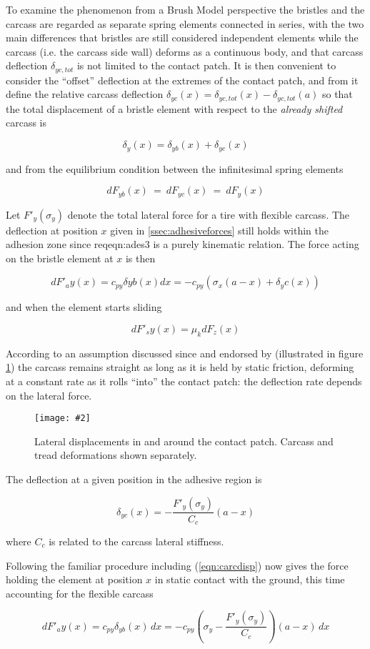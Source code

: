 \documentclass[12pt,a4paper]{report}
\newcommand{\virgolette}[1]{
\textquotedblleft #1\textquotedblright
}
\newcommand{\figura}[5][htbp]{
\begin{figure}[#1]
\begin{center}
\texttt{[image: \#2]}
\caption{#4}\label{#5}
\end{center}
\end{figure}
}
\newcommand{\eq}[2]{
\begin{equation} \label{#1}
#2
\end{equation}
}
\newcommand{\req}[1]{
(\ref{#1})
}
\begin{document}
To examine the phenomenon from a Brush Model perspective the bristles and the carcass are regarded as separate spring elements connected in series, with the two main differences that bristles are still considered independent elements while the carcass (i.e. the carcass side wall) deforms as a continuous body, and that carcass deflection $\delta_{yc,tot}$ is not limited to the contact patch.
It is then convenient to consider the \virgolette{offset} deflection at the extremes of the contact patch, and from it define the relative carcass deflection 
$\delta_{yc}(x)=\delta_{yc,tot}(x) - \delta_{yc,tot}(a)$ so that the total displacement of a bristle element with respect to the \emph{already shifted} carcass is

\eq{eqn:carcdisp}{\delta_{y}(x) = \delta_{yb}(x) + \delta_{yc}(x)}

and from the equilibrium condition between the infinitesimal spring elements
\eq{eqn:carcforcequil}{dF_{yb}(x) \: = \: dF_{yc}(x) \: = \: dF_y(x)}

Let $F'_y(\sigma_y)$ denote the total lateral force for a tire with flexible carcass.
The deflection at position $x$ given in \ref{ssec:adhesiveforces} still holds within the adhesion zone since req{eqn:ades3} is a purely kinematic relation.
The force acting on the bristle element at $x$ is then

\eq{carcDFa}{dF'_ay(x) = c_{py}\delta{yb}(x) dx = - c_{py} (\sigma_x (a-x) + \delta_yc(x))}
and when the element starts sliding
\eq{carcDFs}{dF'_sy(x) = \mu_k dF_z(x)}
According to an assumption discussed since \citep{nhtsa} and endorsed by \citep{pacejka02} (illustrated in figure \ref{fig:carcdeflect}) the carcass remains straight as long as it is held by static friction, deforming at a constant rate as it rolls \virgolette{into} the contact patch: the deflection rate depends on the lateral force.
\figura{pix/carcdeflect.jpg}{width=12cm}{Lateral displacements in and around the contact patch. Carcass and tread deformations shown separately.}{fig:carcdeflect}
The deflection at a given position in the adhesive region is
\eq{eqn:dyc}{\delta_{yc}(x) = -\frac{F'_y(\sigma_y)}{C_c}(a-x)}
where $C_c$ is related to the carcass lateral stiffness.

Following the familiar procedure including \req{eqn:carcdisp} now gives the force holding the element at position $x$ in static contact with the ground, this time accounting for the flexible carcass
\eq{carcDFdasha}{dF'_ay(x) = c_{py} \delta_{yb}(x) \, dx = -c_{py} \left(\sigma_y - \frac{F'_y(\sigma_y)}{C_c} \right)(a - x)\, dx}
\end{document}
